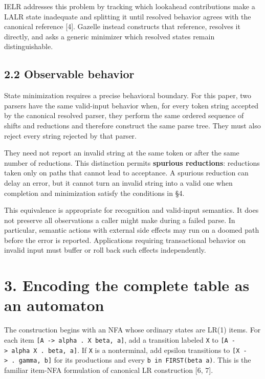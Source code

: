 \documentclass[
  10pt,
]{article}
\begin{document}
IELR addresses this problem by tracking which lookahead contributions
make a LALR state inadequate and splitting it until resolved behavior
agrees with the canonical reference {[}4{]}. Gazelle instead constructs
that reference, resolves it directly, and asks a generic minimizer which
resolved states remain distinguishable.

\hypertarget{22-observable-behavior}{%
\subsection{2.2 Observable behavior}\label{22-observable-behavior}}

State minimization requires a precise behavioral boundary. For this paper, two
parsers have the same valid-input behavior when, for every token string
accepted by the canonical resolved parser, they perform the same ordered
sequence of shifts and reductions and therefore construct the same parse
tree. They must also reject every string rejected by that parser.

They need not report an invalid string at the same token or after the
same number of reductions. This distinction permits \textbf{spurious
reductions}: reductions taken only on paths that cannot lead to
acceptance. A spurious reduction can delay an error, but it cannot turn
an invalid string into a valid one when completion and minimization
satisfy the conditions in §4.

This equivalence is appropriate for recognition and valid-input
semantics. It does not preserve all observations a caller might make
during a failed parse. In particular, semantic actions with external
side effects may run on a doomed path before the error is reported.
Applications requiring transactional behavior on invalid input must
buffer or roll back such effects independently.

\hypertarget{3-encoding-the-complete-table-as-an-automaton}{%
\section{3. Encoding the complete table as an
automaton}\label{3-encoding-the-complete-table-as-an-automaton}}

The construction begins with an NFA whose ordinary states are LR(1)
items. For each item
\texttt{{[}A\ -\textgreater{}\ alpha\ .\ X\ beta,\ a{]}}, add a
transition labeled \texttt{X} to
\texttt{{[}A\ -\textgreater{}\ alpha\ X\ .\ beta,\ a{]}}. If \texttt{X}
is a nonterminal, add epsilon transitions to
\texttt{{[}X\ -\textgreater{}\ .\ gamma,\ b{]}} for its productions and
every \texttt{b\ in\ FIRST(beta\ a)}. This is the familiar item-NFA
formulation of canonical LR construction {[}6, 7{]}.
\end{document}
